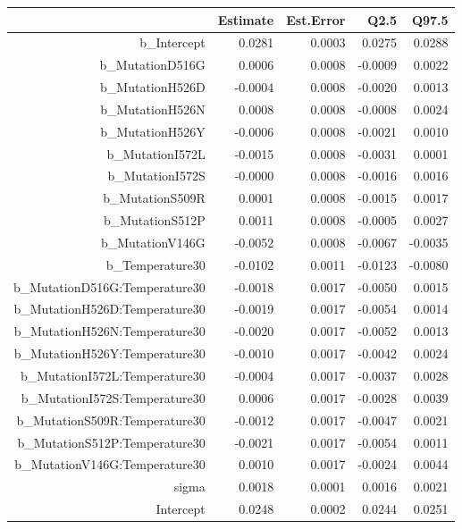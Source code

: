 


\begin{table}[ht]
\centering
\begin{tabular}{rrrrr}
  \hline
 & Estimate & Est.Error & Q2.5 & Q97.5 \\ 
  \hline
b\_Intercept & 0.0281 & 0.0003 & 0.0275 & 0.0288 \\ 
  b\_MutationD516G & 0.0006 & 0.0008 & -0.0009 & 0.0022 \\ 
  b\_MutationH526D & -0.0004 & 0.0008 & -0.0020 & 0.0013 \\ 
  b\_MutationH526N & 0.0008 & 0.0008 & -0.0008 & 0.0024 \\ 
  b\_MutationH526Y & -0.0006 & 0.0008 & -0.0021 & 0.0010 \\ 
  b\_MutationI572L & -0.0015 & 0.0008 & -0.0031 & 0.0001 \\ 
  b\_MutationI572S & -0.0000 & 0.0008 & -0.0016 & 0.0016 \\ 
  b\_MutationS509R & 0.0001 & 0.0008 & -0.0015 & 0.0017 \\ 
  b\_MutationS512P & 0.0011 & 0.0008 & -0.0005 & 0.0027 \\ 
  b\_MutationV146G & -0.0052 & 0.0008 & -0.0067 & -0.0035 \\ 
  b\_Temperature30 & -0.0102 & 0.0011 & -0.0123 & -0.0080 \\ 
  b\_MutationD516G:Temperature30 & -0.0018 & 0.0017 & -0.0050 & 0.0015 \\ 
  b\_MutationH526D:Temperature30 & -0.0019 & 0.0017 & -0.0054 & 0.0014 \\ 
  b\_MutationH526N:Temperature30 & -0.0020 & 0.0017 & -0.0052 & 0.0013 \\ 
  b\_MutationH526Y:Temperature30 & -0.0010 & 0.0017 & -0.0042 & 0.0024 \\ 
  b\_MutationI572L:Temperature30 & -0.0004 & 0.0017 & -0.0037 & 0.0028 \\ 
  b\_MutationI572S:Temperature30 & 0.0006 & 0.0017 & -0.0028 & 0.0039 \\ 
  b\_MutationS509R:Temperature30 & -0.0012 & 0.0017 & -0.0047 & 0.0021 \\ 
  b\_MutationS512P:Temperature30 & -0.0021 & 0.0017 & -0.0054 & 0.0011 \\ 
  b\_MutationV146G:Temperature30 & 0.0010 & 0.0017 & -0.0024 & 0.0044 \\ 
  sigma & 0.0018 & 0.0001 & 0.0016 & 0.0021 \\ 
  Intercept & 0.0248 & 0.0002 & 0.0244 & 0.0251 \\ 

\end{tabular}
\end{table}
